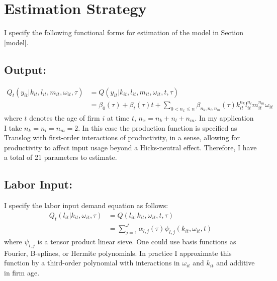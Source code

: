 \documentclass{article}
\begin{document}

\section{Estimation Strategy}

I specify the following functional forms for estimation of the model in Section \ref{model}.

\subsection*{Output:}
\begin{equation}\label{ymodel}
\begin{split}
Q_{t}(y_{it}|k_{it}, l_{it}, m_{it}, \omega_{it}, \tau)&=Q(y_{it}|k_{it}, l_{it}, m_{it}, \omega_{it}, t, \tau)\\
&=\beta_{0}(\tau)+\beta_{t}(\tau)t+\sum_{0<n_{x}\leq n}\beta_{n_{k}, n_{l}, n_{m}}(\tau)k_{it}^{n_{k}}l^{n_{l}}_{it}m^{n_{m}}_{it}\omega_{it}
\end{split}
\end{equation}
where $t$ denotes the age of firm $i$ at time $t$, $n_{x}=n_{k}+n_{l}+n_{m}$. In my application I take $n_{k}=n_{l}=n_{m}=2$. In this case the production function is specified as Translog with first-order interactions of productivity, in a sense, allowing for productivity to affect input usage beyond a Hicks-neutral effect. Therefore, I have a total of 21 parameters to estimate.

\subsection*{Labor Input:}
I specify the labor input demand equation as follows:
\begin{equation} \label{lmodel}
\begin{split}
Q_{t}(l_{it}|k_{it}, \omega_{it}, \tau)&=Q(l_{it}|k_{it}, \omega_{it}, t, \tau)\\
&=\sum_{j=1}^{J}\alpha_{l,j}(\tau)\psi_{l,j}(k_{it}, \omega_{it}, t)
\end{split}
\end{equation}
where $\psi_{l,j}$ is a tensor product linear sieve. One could use basis functions as Fourier, B-splines, or Hermite polynomials. In practice I approximate this function by a third-order polynomial with interactions in $\omega_{it}$ and $k_{it}$ and additive in firm age.
\end{document}
